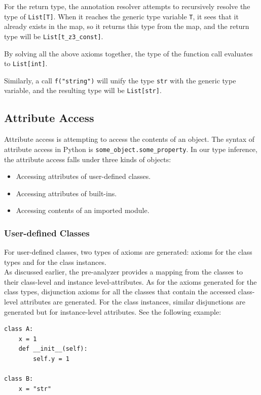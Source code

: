 For the return type, the annotation resolver attempts to recursively resolve the type of \lstinline|List[T]|. When it reaches the generic type variable \lstinline|T|, it sees that it already exists in the map, so it returns this type from the map, and the return type will be \lstinline|List[t_z3_const]|.

By solving all the above axioms together, the type of the function call evaluates to \lstinline|List[int]|.

Similarly, a call \lstinline|f("string")| will unify the type \lstinline|str| with the generic type variable, and the resulting type will be \lstinline|List[str]|.\\ 
\subsection{Attribute Access}
Attribute access is attempting to access the contents of an object. The syntax of attribute access in Python is \lstinline|some_object.some_property|. In our type inference, the attribute access falls under three kinds of objects:
\begin{itemize}
	\item Accessing attributes of user-defined classes.
	\item Accessing attributes of built-ins.
	\item Accessing contents of an imported module.
\end{itemize}

\subsubsection{User-defined Classes}
For user-defined classes, two types of axioms are generated: axioms for the class types and for the class instances. \\

As discussed earlier, the pre-analyzer provides a mapping from the classes to their class-level and instance level-attributes.
As for the axioms generated for the class types, disjunction axioms for all the classes that contain the accessed class-level attributes are generated. For the class instances, similar disjunctions are generated but for instance-level attributes. See the following example:
\begin{lstlisting}
class A:
	x = 1
	def __init__(self):
		self.y = 1

class B:
	x = "str"
\end{lstlisting}

